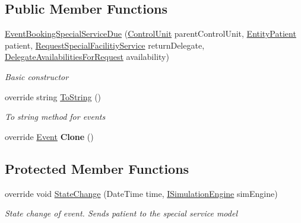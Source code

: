 \subsection*{Public Member Functions}
\begin{DoxyCompactItemize}
\item 
\hyperlink{class_general_health_care_elements_1_1_special_facility_1_1_event_booking_special_service_due_ad8b7dd1f1b29f790d025e9a47c08b9e5}{Event\+Booking\+Special\+Service\+Due} (\hyperlink{class_simulation_core_1_1_h_c_c_m_elements_1_1_control_unit}{Control\+Unit} parent\+Control\+Unit, \hyperlink{class_general_health_care_elements_1_1_entities_1_1_entity_patient}{Entity\+Patient} patient, \hyperlink{class_general_health_care_elements_1_1_special_facility_1_1_request_special_facilitiy_service}{Request\+Special\+Facilitiy\+Service} return\+Delegate, \hyperlink{class_general_health_care_elements_1_1_special_facility_1_1_delegate_availabilities_for_request}{Delegate\+Availabilities\+For\+Request} availability)
\begin{DoxyCompactList}\small\item\em Basic constructor \end{DoxyCompactList}\item 
override string \hyperlink{class_general_health_care_elements_1_1_special_facility_1_1_event_booking_special_service_due_ad2c68f09938f133f26095c68376fb39d}{To\+String} ()
\begin{DoxyCompactList}\small\item\em To string method for events \end{DoxyCompactList}\item 
override \hyperlink{class_simulation_core_1_1_h_c_c_m_elements_1_1_event}{Event} {\bfseries Clone} ()\hypertarget{class_general_health_care_elements_1_1_special_facility_1_1_event_booking_special_service_due_aa8efc224446a0229ab8598cff33568a6}{}\label{class_general_health_care_elements_1_1_special_facility_1_1_event_booking_special_service_due_aa8efc224446a0229ab8598cff33568a6}

\end{DoxyCompactItemize}
\subsection*{Protected Member Functions}
\begin{DoxyCompactItemize}
\item 
override void \hyperlink{class_general_health_care_elements_1_1_special_facility_1_1_event_booking_special_service_due_affbc6c7e996ee7b973d1fd40458fc04f}{State\+Change} (Date\+Time time, \hyperlink{interface_simulation_core_1_1_simulation_classes_1_1_i_simulation_engine}{I\+Simulation\+Engine} sim\+Engine)
\begin{DoxyCompactList}\small\item\em State change of event. Sends patient to the special service model \end{DoxyCompactList}\end{DoxyCompactItemize}
